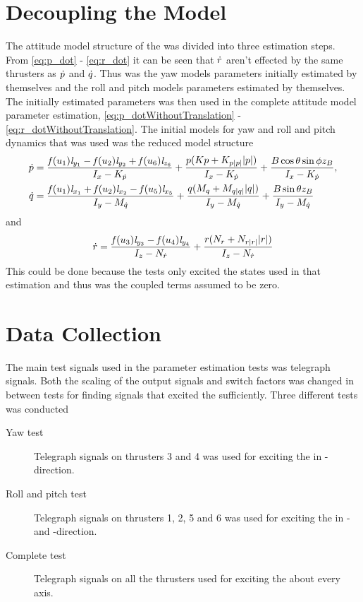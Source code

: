\section{Decoupling the Model} 
The attitude model structure of the \abbrROV was divided into three estimation steps. From \eqref{eq:p_dot} - \eqref{eq:r_dot} it can be seen that $\dot{r}$ aren't effected by the same thrusters as $\dot{p}$ and $\dot{q}$. Thus was the yaw models parameters initially estimated by themselves and the roll and pitch models parameters estimated by themselves. The initially estimated parameters was then used in the complete attitude model parameter estimation, \eqref{eq:p_dotWithoutTranslation} - \eqref{eq:r_dotWithoutTranslation}. The initial models for yaw and roll and pitch dynamics that was used was the reduced model structure
\begin{align} \label{eq:pq_dot_simple}
\dot{p} &= \frac{\mathit{f}(u_{1}) \mathit{l}_{y_{1}} - \mathit{f}(u_{2}) \mathit{l}_{y_{2}} + \mathit{f}(u_{6}) \mathit{l}_{z_{6}}}{I_{x} - K_{\dot{p}}} + \frac{p (Kp + K_{p|p|} |p|)}{I_{x} - K_{\dot{p}}} + \frac{B \cos{\theta} \sin{\phi} z_B}{I_{x} - K_{\dot{p}}}, \\ \label{eq:pq_dot_simple2}
\dot{q} &=\frac{\mathit{f}(u_{1}) \mathit{l}_{x_{1}} + \mathit{f}(u_{2}) \mathit{l}_{x_{2}} - \mathit{f}(u_{5}) \mathit{l}_{x_{5}}}{I_{y} - M_{\dot{q}}} + \frac{q (M_{q} + M_{q|q|} |q|)}{I_{y} - M_{\dot{q}}} + \frac{B \sin{\theta} z_B}{I_{y} - M_{\dot{q}}} 
\end{align} and
\begin{equation} \label{eq:r_dot_simple}
\dot{r} = \frac{\mathit{f}(u_{3}) \mathit{l}_{y_{3}} - \mathit{f}(u_{4}) \mathit{l}_{y_{4}}}{I_{z} - N_{\dot{r}}} + \frac{r (N_{r} + N_{r|r|} |r|)}{I_{z} - N_{\dot{r}}}
\end{equation}
This could be done because the tests only excited the states used in that estimation and thus was the coupled terms assumed to be zero.

\section{Data Collection} 
The main test signals used in the parameter estimation tests was telegraph signals. Both the scaling of the output signals and switch factors was changed in between tests for finding signals that excited the \abbrROV sufficiently.
Three different tests was conducted 
\begin{description}
\item[Yaw test] Telegraph signals on thrusters 3 and 4 was used for exciting the \abbrROV in \yawAngle-direction.
\item[Roll and pitch test] Telegraph signals on thrusters 1, 2, 5 and 6 was used for exciting the \abbrROV in \rollAngle- and \pitchAngle-direction.
\item[Complete test] Telegraph signals on all the thrusters used for exciting the \abbrROV about every axis.
\end{description}

